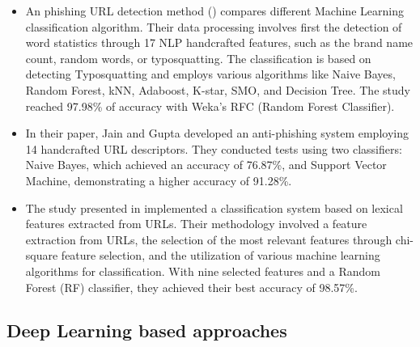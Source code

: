 \documentclass{article}
\begin{document}
    \begin{itemize}

        \item An phishing URL detection method (\cite{PhishingURLDetection}) compares different Machine Learning classification algorithm.
        Their data processing involves first the detection of word statistics through 17 NLP handcrafted features, such as the brand name count, random words, or typosquatting.
        The classification is based on detecting Typosquatting and employs various algorithms like Naive Bayes, Random Forest, kNN, Adaboost, K-star, SMO, and Decision Tree.
        The study reached 97.98\% of accuracy with Weka's RFC (Random Forest Classifier).

        \item In their paper\cite{PhishSafe}, Jain and Gupta developed an anti-phishing system employing 14 handcrafted URL descriptors.
        They conducted tests using two classifiers: Naive Bayes, which achieved an accuracy of 76.87\%, and Support Vector Machine, demonstrating a higher accuracy of 91.28\%.

        \item The study presented in\cite{LexicalFeatureSelection} implemented a classification system based on lexical features extracted from URLs. Their methodology involved a feature extraction from URLs, the selection of the most relevant features through chi-square feature selection, and the utilization of various machine learning algorithms for classification.
        With nine selected features and a Random Forest (RF) classifier, they achieved their best accuracy of 98.57\%.

    \end{itemize}

    \subsection{Deep Learning based approaches}\label{subsec:deep-learning-based-approaches}
\end{document}
